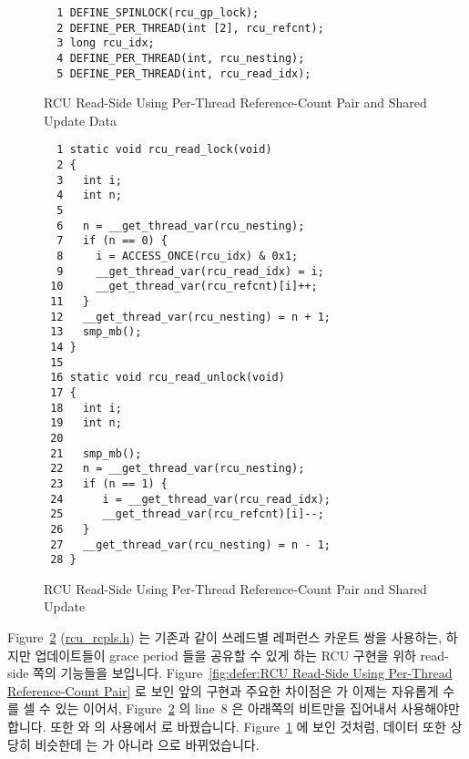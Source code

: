 \begin{figure}[tbp]
{ \scriptsize
\begin{verbatim}
  1 DEFINE_SPINLOCK(rcu_gp_lock);
  2 DEFINE_PER_THREAD(int [2], rcu_refcnt);
  3 long rcu_idx;
  4 DEFINE_PER_THREAD(int, rcu_nesting);
  5 DEFINE_PER_THREAD(int, rcu_read_idx);
\end{verbatim}
}
\caption{RCU Read-Side Using Per-Thread Reference-Count Pair and Shared Update Data}
\label{fig:defer:RCU Read-Side Using Per-Thread Reference-Count Pair and Shared Update Data}
\end{figure}

\begin{figure}[tbp]
{ \scriptsize
\begin{verbatim}
  1 static void rcu_read_lock(void)
  2 {
  3   int i;
  4   int n;
  5
  6   n = __get_thread_var(rcu_nesting);
  7   if (n == 0) {
  8     i = ACCESS_ONCE(rcu_idx) & 0x1;
  9     __get_thread_var(rcu_read_idx) = i;
 10     __get_thread_var(rcu_refcnt)[i]++;
 11   }
 12   __get_thread_var(rcu_nesting) = n + 1;
 13   smp_mb();
 14 }
 15
 16 static void rcu_read_unlock(void)
 17 {
 18   int i;
 19   int n;
 20
 21   smp_mb();
 22   n = __get_thread_var(rcu_nesting);
 23   if (n == 1) {
 24      i = __get_thread_var(rcu_read_idx);
 25      __get_thread_var(rcu_refcnt)[i]--;
 26   }
 27   __get_thread_var(rcu_nesting) = n - 1;
 28 }
\end{verbatim}
}
\caption{RCU Read-Side Using Per-Thread Reference-Count Pair and Shared Update}
\label{fig:defer:RCU Read-Side Using Per-Thread Reference-Count Pair and Shared Update}
\end{figure}

Figure~\ref{fig:defer:RCU Read-Side Using Per-Thread Reference-Count Pair and Shared Update}
(\url{rcu_rcpls.h})
는 기존과 같이 쓰레드별 레퍼런스 카운트 쌍을 사용하는, 하지만 업데이트들이
grace period 들을 공유할 수 있게 하는 RCU 구현을 위하 read-side 쪽의 기능들을
보입니다.
Figure~\ref{fig:defer:RCU Read-Side Using Per-Thread Reference-Count Pair} 로
보인 앞의 구현과 주요한 차이점은  가 이제는 자유롭게 수를 셀 수
있는  이어서,
Figure~\ref{fig:defer:RCU Read-Side Using Per-Thread Reference-Count Pair and Shared Update}
의 line~8 은 아래쪽의 비트만을 집어내서 사용해야만 합니다.
또한  와  의 사용에서  로
바꿨습니다.
Figure~\ref{fig:defer:RCU Read-Side Using Per-Thread Reference-Count Pair and Shared Update Data}
에 보인 것처럼, 데이터 또한 상당히 비슷한데  는  가
아니라  으로 바뀌었습니다.
\iffalse

